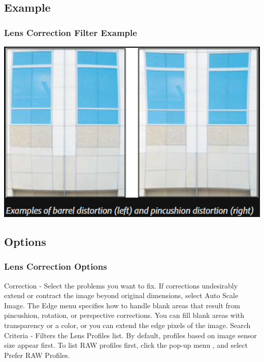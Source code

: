\documentclass{beamer}
\begin{document}
					\subsection{Example}		
		\begin{frame}
			\frametitle{Lens Correction Filter Example}
			\includegraphics[width=1.0\textwidth]{images/Lens Correction Filter Example.png}
		\end{frame}
	
						\subsection{Options}		
	\begin{frame}
		\frametitle{Lens Correction Options}
		\begin{outline}
			\1 Correction - Select the problems you want to fix. If corrections undesirably extend or contract the image beyond original dimensions, select Auto Scale Image.
			\1 The Edge menu specifies how to handle blank areas that result from pincushion, rotation, or perspective corrections. You can fill blank areas with transparency or a color, or you can extend the edge pixels of the image.
			\1 Search Criteria - Filters the Lens Profiles list. 
			\2 By default, profiles based on image sensor size appear first. 
			\2 To list RAW profiles first, click the pop-up menu , and select Prefer RAW Profiles.
		\end{outline}
	\end{frame}
\end{document}
